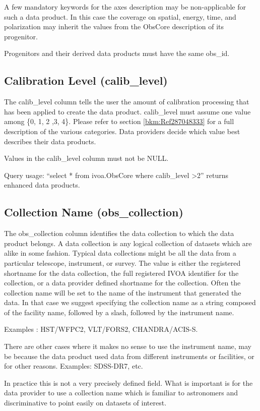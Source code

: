 \documentclass[11pt,a4paper]{ivoa}
\begin{document}
A few mandatory keywords for the axes description may be non-applicable for such a data product. In this case the
coverage on spatial, energy, time, and polarization may inherit the values from the ObsCore description of its
progenitor. 

Progenitors and their derived data products must have the same obs\_id.

\subsection{Calibration Level (calib\_level)}
The calib\_level column tells the user the amount of calibration processing that has been applied to create the data
product. calib\_level must assume one value among \{0, 1, 2 ,3, 4\}. Please refer to section \ref{bkm:Ref287048333} for
a full description of the various categories.  Data providers decide which value best describes their data products.

Values in the calib\_level column must not be NULL.

Query usage: ``select * from ivoa.ObsCore where calib\_level {\textgreater}2'' returns enhanced data products.

\subsection{Collection Name (obs\_collection)}
The obs\_collection column identifies the data collection to which the data product belongs.  A data collection is any
logical collection of datasets which are alike in some fashion.  Typical data collections might be all the data from a
particular telescope, instrument, or survey. The value is either the registered shortname for the data collection, the
full registered IVOA identifier for the collection, or a data provider defined shortname for the collection.  Often the
collection name will be set to the name of the instrument that generated the data.  In that case we suggest specifying
the collection name as a string composed of the facility name, followed by a slash, followed by the instrument name. 

Examples : HST/WFPC2, VLT/FORS2, CHANDRA/ACIS-S. 

There are other cases where it makes no sense to use the instrument name, may be because the data product used data from
different instruments or facilities, or for other reasons.  Examples: SDSS-DR7, etc.

In practice this is not a very precisely defined field.  What is important is for the data provider to use a collection
name which is familiar to astronomers and discriminative to point easily on datasets of interest.  
\end{document}
